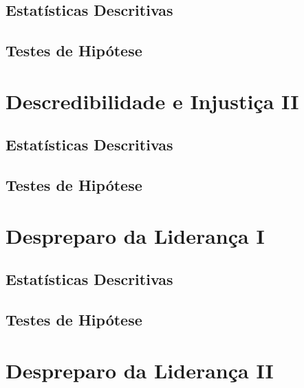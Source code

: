 \documentclass[]{book}
\begin{document}
\hypertarget{estatisticas-descritivas}{%
\subsection{Estatísticas Descritivas}\label{estatisticas-descritivas}}

\hypertarget{testes-de-hipotese}{%
\subsection{Testes de Hipótese}\label{testes-de-hipotese}}

\hypertarget{descredibilidade-e-injustica-ii}{%
\section{Descredibilidade e Injustiça II}\label{descredibilidade-e-injustica-ii}}

\hypertarget{estatisticas-descritivas-1}{%
\subsection{Estatísticas Descritivas}\label{estatisticas-descritivas-1}}

\hypertarget{testes-de-hipotese-1}{%
\subsection{Testes de Hipótese}\label{testes-de-hipotese-1}}

\hypertarget{despreparo-da-lideranca-i}{%
\section{Despreparo da Liderança I}\label{despreparo-da-lideranca-i}}

\hypertarget{estatisticas-descritivas-2}{%
\subsection{Estatísticas Descritivas}\label{estatisticas-descritivas-2}}

\hypertarget{testes-de-hipotese-2}{%
\subsection{Testes de Hipótese}\label{testes-de-hipotese-2}}

\hypertarget{despreparo-da-lideranca-ii}{%
\section{Despreparo da Liderança II}\label{despreparo-da-lideranca-ii}}
\end{document}
